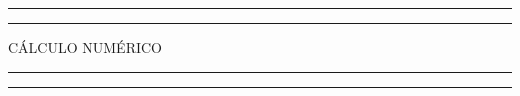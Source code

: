 \newcommand{\plogo}{\fbox{$\mathcal{PL}$}} %

\begin{titlepage} %

    \centering %

    \scshape %

    \vspace*{5\baselineskip} %


    \rule{\textwidth}{1.6pt}\vspace*{-\baselineskip}\vspace*{2pt} %
    \rule{\textwidth}{0.4pt} %

    \vspace{0.75\baselineskip} %

    {\LARGE CÁLCULO NUMÉRICO\\} %

    \vspace{0.75\baselineskip} %

    \rule{\textwidth}{0.4pt}\vspace*{-\baselineskip}\vspace{3.2pt} %
    \rule{\textwidth}{1.6pt} %

    \vspace{1.5\baselineskip} %



    \vspace*{1\baselineskip} %





\end{titlepage}
